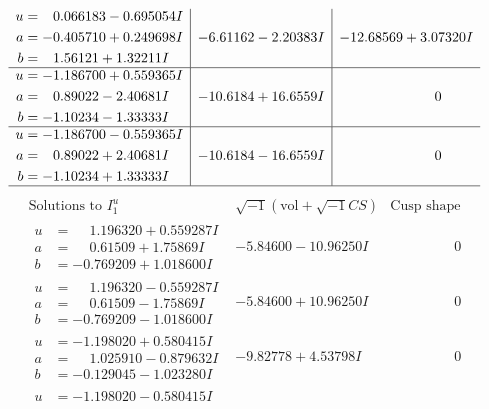 \documentclass[1p]{elsarticle_modified}
\theoremstyle{definition}
\newcommand{\I}{\sqrt{-1}}
\begin{document}
$$\begin{array}{c|c|c}
\begin{aligned}
u &= \phantom{-}0.066183 - 0.695054 I \\
a &= -0.405710 + 0.249698 I \\
b &= \phantom{-}1.56121 + 1.32211 I\end{aligned}
 & -6.61162 - 2.20383 I & -12.68569 + 3.07320 I \\ \hline\begin{aligned}
u &= -1.186700 + 0.559365 I \\
a &= \phantom{-}0.89022 - 2.40681 I \\
b &= -1.10234 - 1.33333 I\end{aligned}
 & -10.6184 + 16.6559 I & \phantom{-0.000000 } 0 \\ \hline\begin{aligned}
u &= -1.186700 - 0.559365 I \\
a &= \phantom{-}0.89022 + 2.40681 I \\
b &= -1.10234 + 1.33333 I\end{aligned}
 & -10.6184 - 16.6559 I & \phantom{-0.000000 } 0\\
 \hline 
 \end{array}$$\newpage$$\begin{array}{c|c|c}  
\text{Solutions to }I^u_{1}& \I (\text{vol} + \sqrt{-1}CS) & \text{Cusp shape}\\
 \hline 
\begin{aligned}
u &= \phantom{-}1.196320 + 0.559287 I \\
a &= \phantom{-}0.61509 + 1.75869 I \\
b &= -0.769209 + 1.018600 I\end{aligned}
 & -5.84600 - 10.96250 I & \phantom{-0.000000 } 0 \\ \hline\begin{aligned}
u &= \phantom{-}1.196320 - 0.559287 I \\
a &= \phantom{-}0.61509 - 1.75869 I \\
b &= -0.769209 - 1.018600 I\end{aligned}
 & -5.84600 + 10.96250 I & \phantom{-0.000000 } 0 \\ \hline\begin{aligned}
u &= -1.198020 + 0.580415 I \\
a &= \phantom{-}1.025910 - 0.879632 I \\
b &= -0.129045 - 1.023280 I\end{aligned}
 & -9.82778 + 4.53798 I & \phantom{-0.000000 } 0 \\ \hline\begin{aligned}
u &= -1.198020 - 0.580415 I \\

\end{aligned}
\end{array}$$
\end{document}
